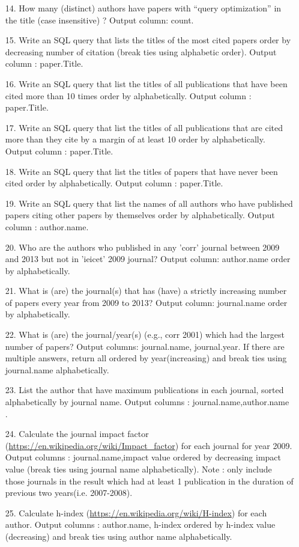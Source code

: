 \documentclass[10pt]{article}
\begin{document}
\begin{enumerate}
\item
[14.] How many (distinct) authors have papers with “query optimization” in the title (case insensitive) ? Output column: count. 
\item
[15.] Write an SQL query that lists the titles of the most cited papers order by decreasing number of citation (break ties using alphabetic order). Output column : paper.Title.
\item
[16.] Write an SQL query that  list the titles of all publications that have been cited more than 10 times order by alphabetically. Output column : paper.Title. 
\item
[17.] Write an SQL query that list the titles of all publications that are cited more than they cite by a margin of at least 10 order by alphabetically. Output column : paper.Title.
\item
[18.] Write an SQL query that list the titles of papers that have never been cited order by alphabetically. Output column : paper.Title.
\item
[19.] Write an SQL query that list the names of all authors who have published papers citing other papers by themselves order by alphabetically. Output column : author.name. 
\item
[20.] Who are the authors who published in any 'corr' journal between 2009 and 2013 but not in 'ieicet' 2009 journal? Output column: author.name order by alphabetically.
\item 
[21.] What is (are) the journal(s) that has (have) a strictly increasing number of papers every year from 2009 to 2013? Output column: journal.name order by alphabetically. 
\item  
[22.] What is (are) the journal/year(s) (e.g., corr 2001) which had the largest number of papers? Output columns: journal.name, journal.year. If there are multiple answers, return all ordered by year(increasing) and break ties using journal.name alphabetically.
\item
[23.] List the author that have maximum publications in each journal, sorted alphabetically by journal name. Output columns : journal.name,author.name .  
\item
[24.] Calculate the journal impact factor (\url{https://en.wikipedia.org/wiki/Impact_factor}) for each journal for year 2009. Output columns : journal.name,impact value ordered by decreasing impact value (break ties using journal name alphabetically). Note : only include those journals in the result which had at least 1 publication in the duration of previous two years(i.e. 2007-2008). 
\item
[25.] Calculate h-index (\url{https://en.wikipedia.org/wiki/H-index}) for each author. Output columns : author.name, h-index ordered by h-index value (decreasing) and break ties using author name alphabetically. 


\end{enumerate}
\end{document}
